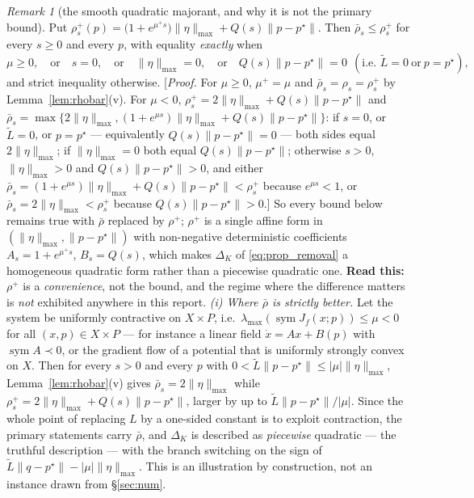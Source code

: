 \documentclass[11pt]{article}
\theoremstyle{remark}\newtheorem{remark}{Remark}
\newcommand{\pstar}{p^\star}
\newcommand{\norm}[1]{\lVert #1\rVert}
\newcommand{\readthis}[1]{\textbf{Read this:} #1}
\begin{document}
\begin{remark}[the smooth quadratic majorant, and why it is not the primary bound]\label{rem:rhoplus}
Put $\rho^{+}_s(p)=\big(1+e^{\mu^{+}s}\big)\norm\eta_{\max}+Q(s)\norm{p-\pstar}$. Then $\bar\rho_s\le\rho^{+}_s$ for every $s\ge0$ and every $p$, with equality \emph{exactly} when
\[
\mu\ge0,\quad\text{or}\quad s=0,\quad\text{or}\quad\norm\eta_{\max}=0,
\quad\text{or}\quad Q(s)\norm{p-\pstar}=0\ \ (\text{i.e.\ }\tilde L=0\ \text{or}\ p=\pstar),
\]
and strict inequality otherwise. [\emph{Proof.} For $\mu\ge0$, $\mu^{+}=\mu$ and $\bar\rho_s=\rho_s=\rho^{+}_s$ by Lemma~\ref{lem:rhobar}(v). For $\mu<0$, $\rho^{+}_s=2\norm\eta_{\max}+Q(s)\norm{p-\pstar}$ and $\bar\rho_s=\max\{2\norm\eta_{\max},(1+e^{\mu s})\norm\eta_{\max}+Q(s)\norm{p-\pstar}\}$: if $s=0$, or $\tilde L=0$, or $p=\pstar$ --- equivalently $Q(s)\norm{p-\pstar}=0$ --- both sides equal $2\norm\eta_{\max}$; if $\norm\eta_{\max}=0$ both equal $Q(s)\norm{p-\pstar}$; otherwise $s>0$, $\norm\eta_{\max}>0$ and $Q(s)\norm{p-\pstar}>0$, and either $\bar\rho_s=(1+e^{\mu s})\norm\eta_{\max}+Q(s)\norm{p-\pstar}<\rho^{+}_s$ because $e^{\mu s}<1$, or $\bar\rho_s=2\norm\eta_{\max}<\rho^{+}_s$ because $Q(s)\norm{p-\pstar}>0$.]
So every bound below remains true with $\bar\rho$ replaced by $\rho^{+}$; $\rho^{+}$ is a single affine form in $(\norm\eta_{\max},\norm{p-\pstar})$ with non-negative deterministic coefficients $A_s=1+e^{\mu^{+}s}$, $B_s=Q(s)$, which makes $\Delta_K$ of \eqref{eq:prop_removal} a homogeneous quadratic form rather than a piecewise quadratic one.
\readthis{$\rho^{+}$ is a \emph{convenience}, not the bound, and the regime where the difference matters is \emph{not} exhibited anywhere in this report.
\emph{(i) Where $\bar\rho$ is strictly better.} Let the system be uniformly contractive on $X\times P$, i.e.\ $\lambda_{\max}(\operatorname{sym}J_f(x;p))\le\mu<0$ for all $(x,p)\in X\times P$ --- for instance a linear field $\dot x=Ax+B(p)$ with $\operatorname{sym}A\prec0$, or the gradient flow of a potential that is uniformly strongly convex on $X$. Then for every $s>0$ and every $p$ with $0<\tilde L\norm{p-\pstar}\le|\mu|\norm\eta_{\max}$, Lemma~\ref{lem:rhobar}(v) gives $\bar\rho_s=2\norm\eta_{\max}$ while $\rho^{+}_s=2\norm\eta_{\max}+Q(s)\norm{p-\pstar}$, larger by up to $\tilde L\norm{p-\pstar}/|\mu|$. Since the whole point of replacing $L$ by a one-sided constant is to exploit contraction, the primary statements carry $\bar\rho$, and $\Delta_K$ is described as \emph{piecewise} quadratic --- the truthful description --- with the branch switching on the sign of $\tilde L\norm{q-\pstar}-|\mu|\norm\eta_{\max}$. This is an illustration by construction, not an instance drawn from \S\ref{sec:num}.
}
\end{remark}
\end{document}
